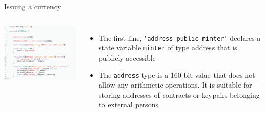 \documentclass[10pt]{beamer}
\begin{document}

\begin{frame}{Issuing a currency}
	\begin{columns}
	    \includegraphics  [scale=0.3]{Images/contract_new}

	    \begin{itemize}
		    \item The first line, \texttt{`address public minter`} declares a state variable \texttt{minter} of type address that is publicly accessible
			\item The \texttt{address} type is a 160-bit value that does not allow any arithmetic operations. It is suitable for storing addresses of contracts or keypairs belonging to external persons
	    \end{itemize}
	\end{columns}
\end{frame}

\end{document}
